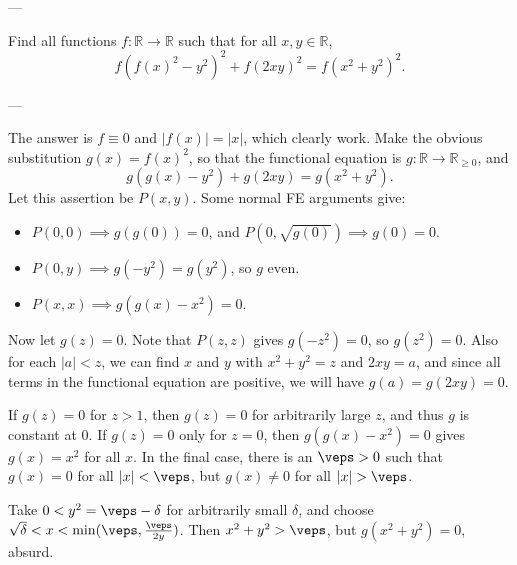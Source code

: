 
---

Find all functions $f:\mathbb R\to\mathbb R$ such that for all $x,y\in\mathbb R$, \[f\left(f(x)^2-y^2\right)^2+f(2xy)^2=f\left(x^2+y^2\right)^2.\]

---

The answer is $f\equiv0$ and $|f(x)|=|x|$, which clearly work. Make the obvious substitution $g(x)=f(x)^2$, so that the functional equation is $g:\mathbb R\to\mathbb R_{\ge0}$, and \[g\left(g(x)-y^2\right)+g(2xy)=g\left(x^2+y^2\right).\]
Let this assertion be $P(x,y)$. Some normal FE arguments give:
\begin{itemize}[itemsep=0em]
    \item $P(0,0)\implies g(g(0))=0$, and $P(0,\sqrt{g(0)})\implies\boxed{g(0)=0}$.
    \item $P(0,y)\implies g(-y^2)=g(y^2)$, so $\boxed{g\text{ even}}$.
    \item $P(x,x)\implies\boxed{g(g(x)-x^2)=0}$.
\end{itemize}
Now let $g(z)=0$. Note that $P(z,z)$ gives $g(-z^2)=0$, so $g(z^2)=0$. Also for each $|a|<z$, we can find $x$ and $y$ with $x^2+y^2=z$ and $2xy=a$, and since all terms in the functional equation are positive, we will have $g(a)=g(2xy)=0$.

If $g(z)=0$ for $z>1$, then $g(z)=0$ for arbitrarily large $z$, and thus $g$ is constant at $0$. If $g(z)=0$ only for $z=0$, then $g(g(x)-x^2)=0$ gives $g(x)=x^2$ for all $x$. In the final case, there is an $\veps>0$ such that $g(x)=0$ for all $|x|<\veps$, but $g(x)\ne0$ for all $|x|>\veps$.

Take $0<y^2=\veps-\delta$ for arbitrarily small $\delta$, and choose $\sqrt{\delta}<x<\min(\veps,\tfrac{\veps}{2y})$. Then $x^2+y^2>\veps$, but $g(x^2+y^2)=0$, absurd.


